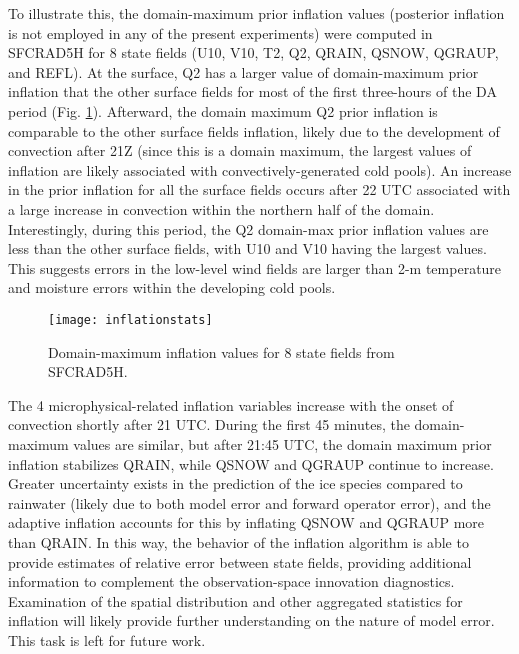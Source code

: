 To illustrate this, the domain-maximum prior inflation values (posterior inflation is not employed in any of the present experiments) were computed in SFCRAD5H for 8 state fields (U10, V10, T2, Q2, QRAIN, QSNOW, QGRAUP, and REFL). At the surface, Q2 has a larger value of domain-maximum prior inflation that the other surface fields for most of the first three-hours of the DA period (Fig. \ref{infstats}). Afterward, the domain maximum Q2 prior inflation is comparable to the other surface fields inflation, likely due to the development of convection after 21Z (since this is a domain maximum, the largest values of inflation are likely associated with convectively-generated cold pools). An increase in the prior inflation for all the surface fields occurs after 22 UTC associated with a large increase in convection within the northern half of the domain. Interestingly, during this period, the Q2 domain-max prior inflation values are less than the other surface fields, with U10 and V10 having the largest values. This suggests errors in the low-level wind fields are larger than 2-m temperature and moisture errors within the developing cold pools.

\begin{figure}
\centering
\texttt{[image: inflationstats]}
\caption{Domain-maximum inflation values for 8 state fields from SFCRAD5H.}
\label{infstats}
\end{figure}

The 4 microphysical-related inflation variables increase with the onset of convection shortly after 21 UTC. During the first 45 minutes, the domain-maximum values are similar, but after 21:45 UTC, the domain maximum prior inflation stabilizes QRAIN, while QSNOW and QGRAUP continue to increase. Greater uncertainty exists in the prediction of the ice species compared to rainwater (likely due to both model error and forward operator error), and the adaptive inflation accounts for this by inflating QSNOW and QGRAUP more than QRAIN. In this way, the behavior of the inflation algorithm is able to provide estimates of relative error between state fields, providing additional information to complement the observation-space innovation diagnostics. Examination of the spatial distribution and other aggregated statistics for inflation will likely provide further understanding on the nature of model error. This task is left for future work.
